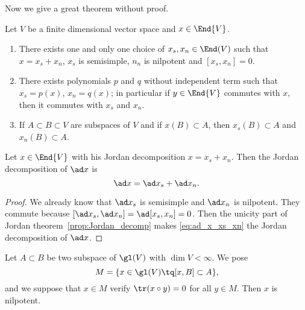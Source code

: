 Now we give a great theorem without proof.
\begin{theorem}
	Let $V$ be a finite dimensional vector space and $x\in\End{V}$.

	\begin{enumerate}
		\item There exists one and only one choice of $x_s,x_n\in\End(V)$ such that $x=x_s+x_n$, $x_s$ is semisimple, $n_n$ is nilpotent and $[x_s,x_n]=0$.

		\item There exists polynomials $p$ and $q$ without independent term such that $x_s=p(x)$, $x_n=q(x)$; in particular if $y\in\End{V}$ commutes with $x$, then it commutes with $x_s$ and $x_n$.

		\item If $A\subset B\subset V$ are subspaces of $V$ and if $x(B)\subset A$, then $x_s(B)\subset A$ and $x_n(B)\subset A$.
	\end{enumerate}
	\label{prop:Jordan_decomp}
\end{theorem}

\begin{lemma}\label{lem:Jordan_ad}
	Let $x\in\End{V}$ with his Jordan decomposition $x=x_s+x_n$. Then the Jordan decomposition of $\ad x$ is
	\begin{equation}\label{eq:ad_x_xs_xn}
		\ad x=\ad x_s+\ad x_n.
	\end{equation}
\end{lemma}

\begin{proof}
	We already know that $\ad x_s$ is semisimple and $\ad x_n$ is nilpotent. They commute because $[\ad x_s,\ad x_n]=\ad[x_s,x_n]=0$. Then the unicity part of Jordan theorem~\ref{prop:Jordan_decomp} makes \eqref{eq:ad_x_xs_xn} the Jordan decomposition of $\ad x$.
\end{proof}

\begin{lemma}\label{lem:M_nil}
	Let $A\subset B$ be two subspace of $\gl(V)$ with $\dim V<\infty$. We pose
	\[
		M=\{x\in\gl(V)\tq [x,B]\subset A\},
	\]
	and we suppose that $x\in M$ verify $\tr(x\circ y)=0$ for all $y\in M$. Then $x$ is nilpotent.
\end{lemma}

